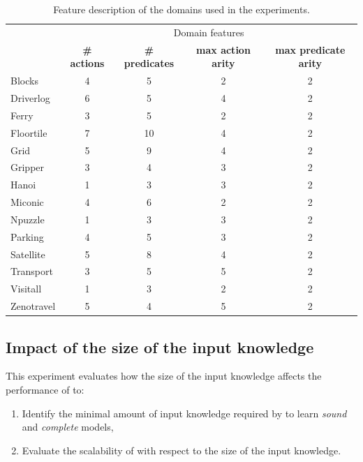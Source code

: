 \begin{table}[hbt!]
  \begin{footnotesize}			  
		\begin{center}
			\begin{tabular}{l|c|c|c|c|}	
				& \multicolumn{4}{c|}{Domain features}\\ \cline{2-5}
				 & {\bf \# actions} & {\bf \# predicates} & {\bf max action arity} & {\bf max predicate arity}  \\
				\hline
				Blocks & 4 & 5 & 2 & 2  \\
				Driverlog & 6 & 5 & 4 & 2  \\
				Ferry & 3 & 5 & 2 & 2  \\
				Floortile & 7 & 10 & 4 & 2  \\
				Grid & 5 & 9 & 4 & 2  \\
				Gripper & 3 & 4 & 3 & 2  \\
				Hanoi & 1 & 3 & 3 & 2  \\
				Miconic & 4 & 6 & 2 & 2  \\
				Npuzzle & 1 & 3 & 3 & 2  \\
				Parking & 4 & 5 & 3 & 2  \\
				Satellite & 5 & 8 & 4 & 2  \\
				Transport & 3 & 5 & 5 & 2  \\
				Visitall & 1 & 3 & 2 & 2  \\
				Zenotravel & 5 & 4 & 5 & 2
			\end{tabular}
		\end{center}
                \end{footnotesize}			                
	\caption{\small Feature description of the domains used in the experiments.}
	\label{tab:domain_features}	
\end{table}

\subsection{Impact of the size of the input knowledge}
This experiment evaluates how the size of the input knowledge affects the performance of \FAMA to:
\begin{enumerate}
	\item Identify the minimal amount of input knowledge required by \FAMA to learn {\em sound} and {\em complete} models,
	\item Evaluate the scalability of \FAMA with respect to the size of the input knowledge. %
\end{enumerate} 

